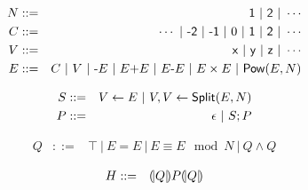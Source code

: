 
\begin{eqnarray*}
  N & ::= & \dslcode{1}\ |\ \dslcode{2}\ |\ \cdots\\
  C & ::= & \cdots \ |\ \dslcode{-2}\ |\ \dslcode{-1} \ |\ 0\ |\ 
            \dslcode{1}\ |\ \dslcode{2}\ |\ \cdots\\
  V & ::= & \dslcode{x} \ |\ \dslcode{y} \ |\ \dslcode{z} \ |\ \cdots\\
  E & ::= &  C \ |\ V \ |\  \dslcode{-}E \ |\ E \dslcode{+} E 
             \ |\ E \dslcode{-} E
             \ |\ E \times E \ |\ \dslcode{Pow} (E, N)
\end{eqnarray*}

\begin{eqnarray*}
  S & ::= & V \leftarrow E 
            \ |\  V, V \leftarrow \mbox{\textsf{Split}} (E, N)\\
  P & ::= & \epsilon \ |\ S; P
\end{eqnarray*}

\begin{eqnarray*}
  Q & ::= & \top
     \ |\   E = E
     \ |\   E \equiv E \mod N
     \ |\   Q \wedge Q
\end{eqnarray*}

\begin{eqnarray*}
  H & ::= & {(\!|}{Q}{|\!)} P {(\!|}{Q}{|\!)}
\end{eqnarray*}
